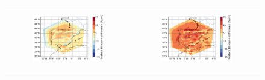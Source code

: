 \begin{figure}[htbp]
\begin{tabular}{cc}
        \begin{subfigure}[b]{0.33\textwidth}
            \caption{}
            \includegraphics[width=\textwidth]{images/chap4/forcing_source/diff_map_LWdnSFC_era_era.png}
        \end{subfigure} &
        \begin{subfigure}[b]{0.33\textwidth}
            \caption{}
            \includegraphics[width=\textwidth]{images/chap4/forcing_source/diff_map_LWdnSFC_ico_era.png}
        \end{subfigure} \\
    \end{tabular}
    \caption{}
    \label{fig:forcing_source_ERA_diff_maps_endvars}
\end{figure}


